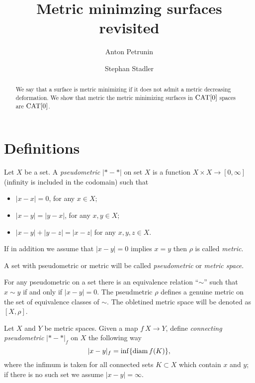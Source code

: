 \documentclass[a4paper,10pt]{amsart}
\begin{document}
\title{Metric minimzing surfaces revisited}
\author{Anton Petrunin}
\address{A. Petrunin\newline\vskip-4mm
Math. Dept. PSU,
University Park, PA 16802,
USA}
\author{Stephan Stadler}


\date{}

\begin{abstract}
We say that a surface is metric minimizing if it does not admit a metric decreasing deformation.
We show that metric the metric minimizing surfaces in $\mathop{\rm CAT}\nolimits[0]$ spaces are $\mathop{\rm CAT}\nolimits[0]$.
\end{abstract}
\maketitle



\section{Definitions}

Let $X$ be a set.
A \emph{pseudometric} $|{*}-{*}|$ on set $X$ 
is a function $X\times X\to[0,\infty]$ (infinity is included in the codomain)
such that 
\begin{itemize}
\item $|x-x|=0$, for any $x\in X$;
\item $|x-y|=|y-x|$, for any $x,y\in X$;
\item $|x-y|+|y-z|=|x-z|$ for any  $x,y,z\in X$.
\end{itemize}

If in addition we assume that $|x-y|=0$ implies $x=y$ then $\rho$ is called \emph{metric}.


A set with pseudometric or metric will be called \emph{pseudometric} or \emph{metric space}.

For any pseudometric on a set 
there is an equivalence relation ``$\sim$''
such that $x\sim y$ if and only if $|x-y|=0$.
The pseudmetric $\rho$ defines a genuine metric on the set of equivalence classes of $\sim$.
The obletined metric space will be denoted as $[X,\rho]$.

Let $X$ and $Y$ be metric spaces.
Given a map $f\:X\to Y$,
define \emph{connecting pseudometric} $|{*}-{*}|_f$ on $X$ 
the following way
\[|x-y|_f=\inf\{\mathop{\rm diam}\nolimits f(K)\},\]
where the infimum is taken for all connected sets $K\subset X$ which contain $x$ and $y$;
if there is no such set we assume $|x-y|=\infty$.
\end{document}

